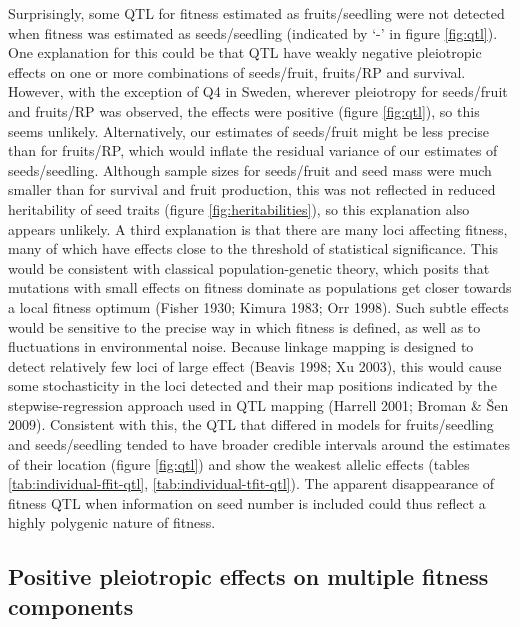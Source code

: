 \documentclass[]{article}
\begin{document}
Surprisingly, some QTL for fitness estimated as fruits/seedling were not detected when fitness was estimated as seeds/seedling (indicated by `-' in figure \ref{fig:qtl}). One explanation for this could be that QTL have weakly negative pleiotropic effects on one or more combinations of seeds/fruit, fruits/RP and survival. However, with the exception of Q4 in Sweden, wherever pleiotropy for seeds/fruit and fruits/RP was observed, the effects were positive (figure \ref{fig:qtl}), so this seems unlikely. Alternatively, our estimates of seeds/fruit might be less precise than for fruits/RP, which would inflate the residual variance of our estimates of seeds/seedling. Although sample sizes for seeds/fruit and seed mass were much smaller than for survival and fruit production, this was not reflected in reduced heritability of seed traits (figure \ref{fig:heritabilities}), so this explanation also appears unlikely. A third explanation is that there are many loci affecting fitness, many of which have effects close to the threshold of statistical significance. This would be consistent with classical population-genetic theory, which posits that mutations with small effects on fitness dominate as populations get closer towards a local fitness optimum (Fisher 1930; Kimura 1983; Orr 1998). Such subtle effects would be sensitive to the precise way in which fitness is defined, as well as to fluctuations in environmental noise. Because linkage mapping is designed to detect relatively few loci of large effect (Beavis 1998; Xu 2003), this would cause some stochasticity in the loci detected and their map positions indicated by the stepwise-regression approach used in QTL mapping (Harrell 2001; Broman \& Šen 2009). Consistent with this, the QTL that differed in models for fruits/seedling and seeds/seedling tended to have broader credible intervals around the estimates of their location (figure \ref{fig:qtl}) and show the weakest allelic effects (tables \ref{tab:individual-ffit-qtl}, \ref{tab:individual-tfit-qtl}). The apparent disappearance of fitness QTL when information on seed number is included could thus reflect a highly polygenic nature of fitness.

\hypertarget{positive-pleiotropic-effects-on-multiple-fitness-components}{%
\subsection{Positive pleiotropic effects on multiple fitness components}\label{positive-pleiotropic-effects-on-multiple-fitness-components}}
\end{document}
